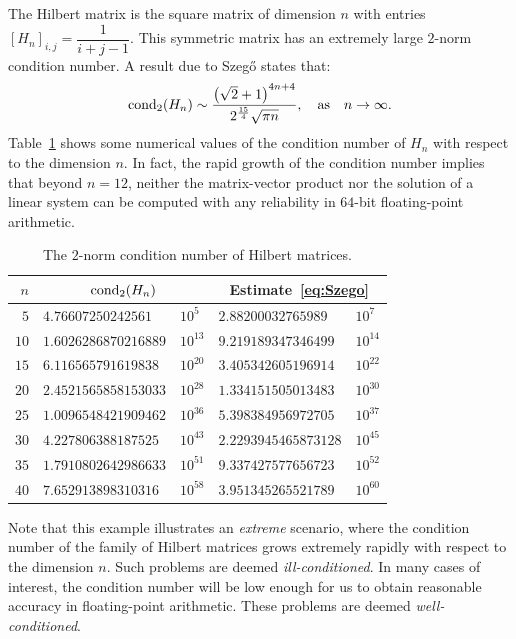 \begin{example}
The Hilbert matrix is the square matrix of dimension $n$ with entries $[H_n]_{i,j} = \dfrac{1}{i+j-1}$. This symmetric matrix has an extremely large $2$-norm condition number. A result due to Szeg\H o states that:
\begin{equation}\label{eq:Szego}
\cond_2(H_n) \sim \dfrac{\pr(\sqrt{2}+1)^{4n+4}}{2^{\frac{15}{4}}\sqrt{\pi n}},\quad{\rm as}\quad n\to\infty.
\end{equation}
Table~\ref{table:Hilbert} shows some numerical values of the condition number of $H_n$ with respect to the dimension $n$. In fact, the rapid growth of the condition number implies that beyond $n=12$, neither the matrix-vector product nor the solution of a linear system can be computed with any reliability in $64$-bit floating-point arithmetic.
\begin{table}[htp]
\caption{The $2$-norm condition number of Hilbert matrices.}
\begin{center}
\begin{tabular}{rl@{$\times$}ll@{$\times$}l}
\hline
$n$ & \multicolumn{2}{c}{$\operatorname{cond}_2(H_n)$} & \multicolumn{2}{c}{Estimate~\eqref{eq:Szego}}\\
\hline
$5$ & $4.76607250242561$ & $10^5$ & $2.88200032765989$ & $10^{7}$\\
$10$ & $1.6026286870216889$ & $10^{13}$ & $9.219189347346499$ & $10^{14}$\\
$15$ & $6.116565791619838$ & $10^{20}$ & $3.405342605196914$ & $10^{22}$\\
$20$ & $2.4521565858153033$ & $10^{28}$ & $1.334151505013483$ & $10^{30}$\\
$25$ & $1.0096548421909462$ & $10^{36}$ & $5.398384956972705$ & $10^{37}$\\
$30$ & $4.227806388187525$ & $10^{43}$ & $2.2293945465873128$ & $10^{45}$\\
$35$ & $1.7910802642986633$ & $10^{51}$ & $9.337427577656723$ & $10^{52}$\\
$40$ & $7.652913898310316$ & $10^{58}$ & $3.951345265521789$ & $10^{60}$\\
\hline
\end{tabular}
\end{center}
\label{table:Hilbert}
\end{table}%
\end{example}

Note that this example illustrates an {\em extreme} scenario, where the condition number of the family of Hilbert matrices grows extremely rapidly with respect to the dimension $n$. Such problems are deemed {\em ill-conditioned}. In many cases of interest, the condition number will be low enough for us to obtain reasonable accuracy in floating-point arithmetic. These problems are deemed {\em well-conditioned}.

